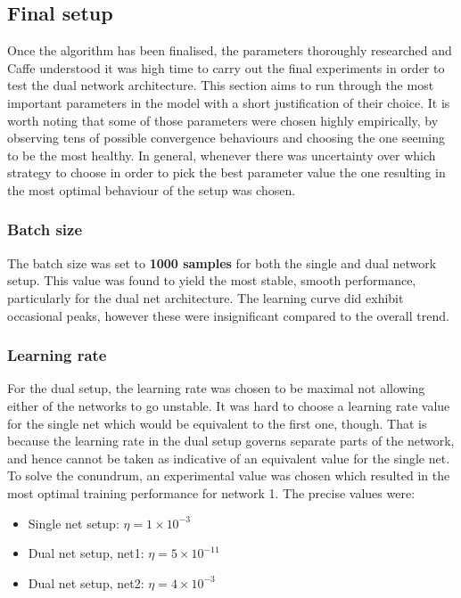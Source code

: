 \documentclass[a4paper, 12pt]{article}
\numberwithin{equation}{section}
\begin{document}
	\subsection{Final setup}

	Once the algorithm has been finalised, the parameters thoroughly researched and Caffe understood it was high time to carry out the final experiments in order to test the dual network architecture. This section aims to run through the most important parameters in the model with a short justification of their choice. It is worth noting that some of those parameters were chosen highly empirically, by observing tens of possible convergence behaviours and choosing the one seeming to be the most healthy. In general, whenever there was uncertainty over which strategy to choose in order to pick the best parameter value the one resulting in the most optimal behaviour of the setup was chosen.

	\subsubsection{Batch size}

	The batch size was set to \textbf{1000 samples} for both the single and dual network setup. This value was found to yield the most stable, smooth performance, particularly for the dual net architecture. The learning curve did exhibit occasional peaks, however these were insignificant compared to the overall trend.

	\subsubsection{Learning rate}

	For the dual setup, the learning rate was chosen to be maximal not allowing either of the networks to go unstable. It was hard to choose a learning rate value for the single net which would be equivalent to the first one, though. That is because the learning rate in the dual setup governs separate parts of the network, and hence cannot be taken as indicative of an equivalent value for the single net. To solve the conundrum, an experimental value was chosen which resulted in the most optimal training performance for network 1. The precise values were:

	\begin{itemize}
		\item Single net setup: $\eta=1\times10^{-3}$
		\item Dual net setup, net1: $\eta=5\times10^{-11}$
		\item Dual net setup, net2: $\eta=4\times10^{-3}$
	\end{itemize}
\end{document}
